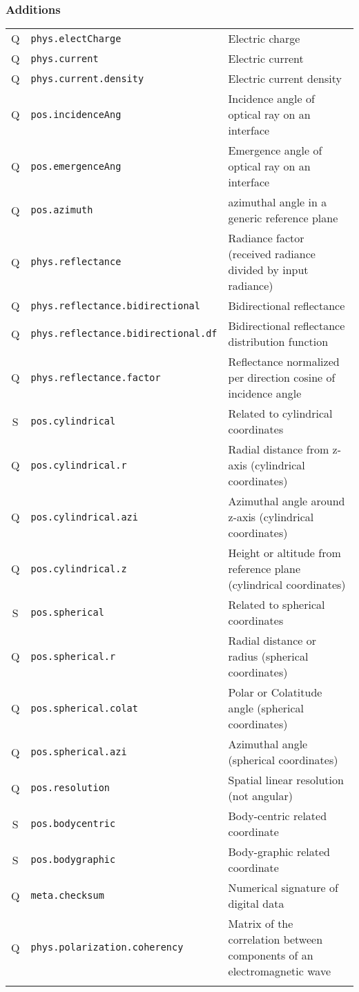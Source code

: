 \documentclass[11pt,a4paper]{ivoa}
\begin{document}
\subsubsection*{Additions}
\footnotesize\begin{longtable}[h!]{c|p{39.5ex}|D{0.45\textwidth}}
\sptablerule
Q & {\tt phys.electCharge} & Electric charge\\
Q & {\tt phys.current} & Electric current\\
Q & {\tt phys.current.density} & Electric current density\\
Q & {\tt pos.incidenceAng} & Incidence angle of optical ray on an interface\\
Q & {\tt pos.emergenceAng} & Emergence angle of optical ray on an interface\\
Q & {\tt pos.azimuth} & azimuthal angle in a generic reference plane\\
Q & {\tt phys.reflectance} & Radiance factor (received radiance divided by input radiance)\\
Q & {\tt phys.reflectance.bidirectional} & Bidirectional reflectance\\
Q & {\tt phys.reflectance.bidirectional.df} & Bidirectional reflectance distribution function\\
Q & {\tt phys.reflectance.factor} & Reflectance normalized per direction cosine of incidence angle\\
S & {\tt pos.cylindrical} & Related to cylindrical coordinates\\
Q & {\tt pos.cylindrical.r} & Radial distance from z-axis (cylindrical coordinates)\\
Q & {\tt pos.cylindrical.azi} & Azimuthal angle around z-axis (cylindrical coordinates)\\
Q & {\tt pos.cylindrical.z} & Height or altitude from reference plane (cylindrical coordinates)\\
S & {\tt pos.spherical} & Related to spherical coordinates\\
Q & {\tt pos.spherical.r} & Radial distance or radius (spherical coordinates)\\
Q & {\tt pos.spherical.colat} & Polar or Colatitude angle (spherical coordinates)\\
Q & {\tt pos.spherical.azi} & Azimuthal angle (spherical coordinates)\\
Q & {\tt pos.resolution} & Spatial linear resolution (not angular)\\
S & {\tt pos.bodycentric} & Body-centric related coordinate\\
S & {\tt pos.bodygraphic} & Body-graphic related coordinate\\
Q & {\tt meta.checksum} & Numerical signature of digital data\\
Q & {\tt phys.polarization.coherency} & Matrix of the correlation between components of an electromagnetic wave\\
\sptablerule
\end{longtable}
\end{document}
